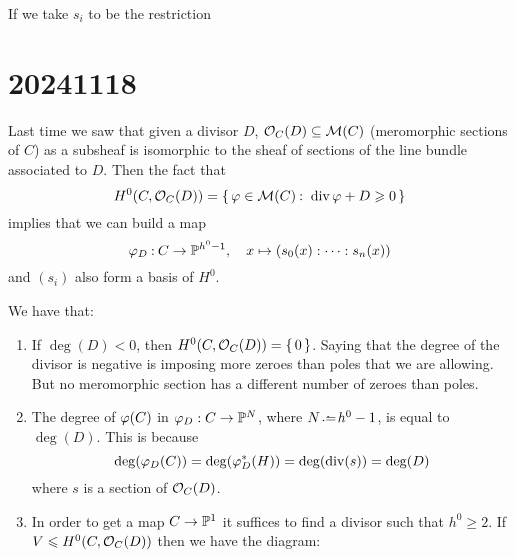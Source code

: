 \documentclass[12pt]{memoir}
\begin{document}
If we take $s_i$ to be the restriction 

\section{20241118}

Last time we saw that given a divisor $D$, $\mathcal{O}_C(D)\subseteq\mathcal{M}(C)$ (meromorphic sections of $C$) as a subsheaf is isomorphic to the sheaf of sections of the line bundle associated to $D$. Then the fact that 
$$H^0(C,\cO_C(D))=\set{\vf\in\cM(C)\:\ \div\vf+D\geq 0}$$
implies that we can build a map 
$$\varphi_D\mathbin{:} C\to\mathbb{P}^{h^0-1},\quad x\mapsto(s_0(x):\dots:s_n(x))$$
and $(s_i)$ also form a basis of $H^0$.

\begin{Rmk}
    We have that:
    \begin{enumerate}
        \item If $\deg(D)<0$, then $H^0(C,\mathcal{O}_C(D))=\{\,0\,\}$.
        Saying that the degree of the divisor is negative is imposing more zeroes than poles that we are allowing. But no meromorphic section has a different number of zeroes than poles. 
        \item The degree of $\varphi(C)$ in $\varphi_D:C\to\mathbb{P}^{N}$, where $N\defeq h^0-1$, is equal to $\deg(D)$. This is because
        $$\deg(\varphi_D(C))=\deg(\varphi_D^\ast(H))=\deg(\operatorname{div}(s))=\deg(D)$$
        where $s$ is a section of $\mathcal{O}_C(D)$.
        \item In order to get a map $C\to\mathbb{P}^1$ it suffices to find a divisor such that $h^0\geq 2$. If $V\leqslant H^0(C,\mathcal{O}_C(D))$ then we have the diagram:
        \begin{center}
        \end{center}
    \end{enumerate}
\end{Rmk}
\end{document}
